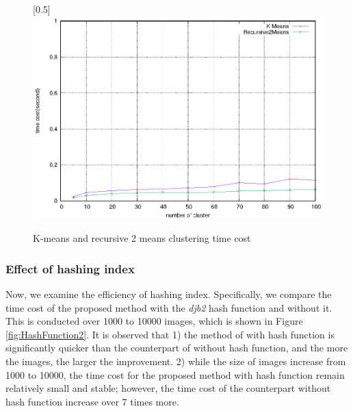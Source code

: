 \documentclass[runningheads,a4paper]{llncs}
\begin{document}
\begin{figure}[ht!]\vspace{-4ex}
 \centering
       \scalebox{0.5}[0.5]{\includegraphics{ClusteringTimeCost.eps}}\vspace{-3ex}
    \caption{\small \vspace{-3ex} K-means and recursive 2 means clustering time cost}
     \label{fig:Cluster}
\end{figure}

\subsubsection{Effect of hashing index}

Now, we examine the efficiency of hashing index. 
Specifically, 
we compare the time cost of the proposed method with the \textit{djb2} hash function and without it. 
This is conducted over 1000 to 10000 images,
which is shown in Figure \ref{fig:HashFunction2}. 
It is observed that
1) the method of with hash function is significantly quicker than the counterpart of without hash function,
and the more the images, the larger the improvement. 
2) while the size of images increase from 1000 to 10000,
the time cost for the proposed method with hash function remain relatively small and stable;
however, the time cost of the counterpart without hash function increase over 7 times more. 
%
\end{document}
